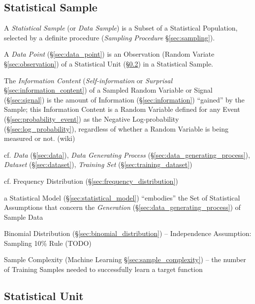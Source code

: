 \subsection{Statistical Sample}\label{sec:sample}

A \emph{Statistical Sample} (or \emph{Data Sample}) is a Subset of a Statistical
Population, selected by a definite procedure (\emph{Sampling Procedure}
\S\ref{sec:sampling}).

\fist A \emph{Data Point} (\S\ref{sec:data_point}) is an Observation (Random
Variate \S\ref{sec:observation}) of a Statistical Unit
(\S\ref{sec:statistical_unit}) in a Statistical Sample.

The \emph{Information Content} (\emph{Self-information} or \emph{Surprisal}
\S\ref{sec:information_content}) of a Sampled Random Variable or Signal
(\S\ref{sec:signal}) is the amount of Information (\S\ref{sec:information})
``gained'' by the Sample; this Information Content is a Random Variable defined
for any Event (\S\ref{sec:probability_event}) as the Negative Log-probability
(\S\ref{sec:log_probability}), regardless of whether a Random Variable is being
measured or not. (wiki)

\fist cf. \emph{Data} (\S\ref{sec:data}), \emph{Data Generating Process}
(\S\ref{sec:data_generating_process}), \emph{Dataset} (\S\ref{sec:dataset}),
\emph{Training Set} (\S\ref{sec:training_dataset})

\fist cf. Frequency Distribution (\S\ref{sec:frequency_distribution})

\fist a Statistical Model (\S\ref{sec:statistical_model}) ``embodies'' the Set
of Statistical Assumptions that concern the \emph{Generation}
(\S\ref{sec:data_generating_process}) of Sample Data

Binomial Distribution (\S\ref{sec:binomial_distribution}) -- Independence
Assumption: Sampling 10\% Rule (TODO)

Sample Complexity (Machine Learning \S\ref{sec:sample_complexity}) -- the number
of Training Samples needed to successfully learn a target function



\subsection{Statistical Unit}\label{sec:statistical_unit}

